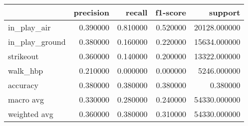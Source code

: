 \begin{tabular}{lrrrr}
\toprule
 & precision & recall & f1-score & support \\
\midrule
in_play_air & 0.390000 & 0.810000 & 0.520000 & 20128.000000 \\
in_play_ground & 0.380000 & 0.160000 & 0.220000 & 15634.000000 \\
strikeout & 0.360000 & 0.140000 & 0.200000 & 13322.000000 \\
walk_hbp & 0.210000 & 0.000000 & 0.000000 & 5246.000000 \\
accuracy & 0.380000 & 0.380000 & 0.380000 & 0.380000 \\
macro avg & 0.330000 & 0.280000 & 0.240000 & 54330.000000 \\
weighted avg & 0.360000 & 0.380000 & 0.310000 & 54330.000000 \\
\bottomrule
\end{tabular}
